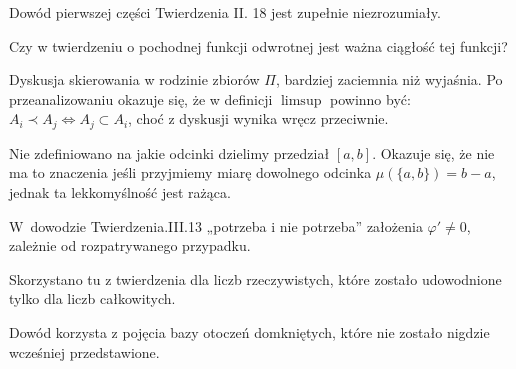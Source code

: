 \documentclass[a4paper,11pt]{article}
\begin{document}
\vspace{\spaceFour}





\noindent
{} Dowód pierwszej części Twierdzenia II. 18 jest zupełnie
niezrozumiały.

\vspace{\spaceFour}





\noindent
{} Czy w twierdzeniu o pochodnej funkcji odwrotnej jest ważna
ciągłość tej funkcji?

\vspace{\spaceFour}





\noindent
{} Dyskusja skierowania w rodzinie zbiorów $\Pi$,
bardziej zaciemnia niż wyjaśnia. Po przeanalizowaniu okazuje się, że w
definicji $\limsup$ powinno być: \\
$A_{ i } \prec A_{ j } \Leftrightarrow A_{ j } \subset A_{ i }$, choć z
dyskusji wynika wręcz przeciwnie.

\vspace{\spaceFour}





\noindent
{} Nie zdefiniowano na jakie odcinki dzielimy przedział $[ a, b ]$.
Okazuje się, że nie ma to znaczenia jeśli przyjmiemy miarę dowolnego
odcinka $\mu ( \{ a, b \} ) = b - a$, jednak ta lekkomyślność jest rażąca.

\vspace{\spaceFour}





\noindent
{} W~dowodzie Twierdzenia.III.13 „potrzeba i nie potrzeba” założenia
$\varphi' \neq 0$, zależnie od rozpatrywanego przypadku.

\vspace{\spaceFour}





\noindent
{} Skorzystano tu z twierdzenia dla liczb rzeczywistych, które
zostało udowodnione tylko dla liczb całkowitych.

\vspace{\spaceFour}





\noindent
{} Dowód korzysta z pojęcia bazy otoczeń domkniętych, które nie
zostało nigdzie wcześniej przedstawione.
\end{document}
